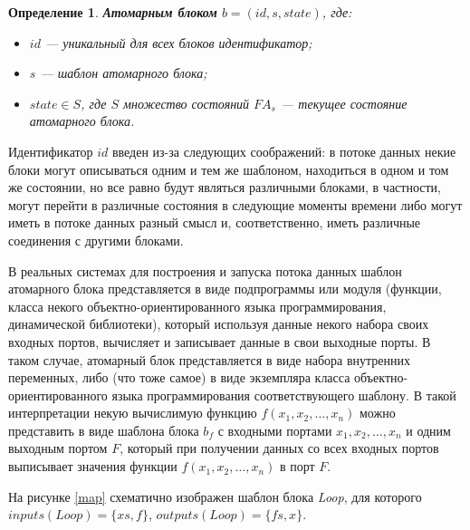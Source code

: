 \documentclass[10pt,a4paper]{article}
\newtheorem{defen}{Определение}
\newcommand{\FA}{F\!A}
\begin{document}
\begin{defen}
  \textbf{Атомарным блоком} $b = (id, s, state)$, где:
  \begin{itemize}
    \item $id$ --- уникальный для всех блоков идентификатор;
    \item $s$ --- шаблон атомарного блока;
    \item $state \in S$, где $S$ множество состояний $\FA_s$ --- текущее состояние атомарного блока.
  \end{itemize}
\end{defen}

Идентификатор $id$ введен из-за следующих соображений: в потоке данных некие блоки могут описываться одним и тем же шаблоном, находиться в одном и том же состоянии,
но все равно будут являться различными блоками, в частности, могут перейти в различные состояния в следующие моменты времени либо могут иметь в потоке данных разный смысл и,
соответственно, иметь различные соединения с другими блоками.

В реальных системах для построения и запуска потока данных шаблон атомарного блока представляется в виде подпрограммы или модуля
(функции, класса некого объектно-ориентированного языка программирования, динамической библиотеки), который используя данные некого набора своих входных портов,
вычисляет и записывает данные в свои выходные порты. В таком случае, атомарный блок представляется в виде набора внутренних переменных,
либо (что тоже самое) в виде экземпляра класса объектно-ориентированного языка программирования соответствующего шаблону.
В такой интерпретации некую вычислимую функцию $f(x_1, x_2, \dots, x_n)$ можно представить в виде шаблона блока $b_f$
с входными портами $x_1, x_2, \dots, x_n$ и одним выходным портом $F$, который при получении данных со всех входных портов
выписывает значения функции $f(x_1, x_2, \dots, x_n)$ в порт $F$.

На рисунке \ref{map} схематично изображен шаблон блока \textit{Loop}, для которого $inputs(Loop) = \{xs, f\}$, $outputs(Loop) = \{fs, x\}$.
\end{document}
